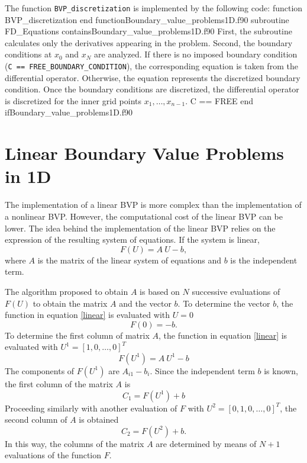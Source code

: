 \newpage 
The function  \verb|BVP_discretization| is implemented by the following code: 
 \vspace{0.2cm} 
             {function BVP_discretization}
             {end function}{Boundary_value_problems1D.f90}
{subroutine FD_Equations}
{contains}{Boundary_value_problems1D.f90}
First, the subroutine calculates only the derivatives appearing in the problem. Second, the boundary conditions at $ x_0 $ and 
$x_N $ are analyzed. If there is no imposed boundary condition (\verb|C == FREE_BOUNDARY_CONDITION|), the corresponding equation is taken 
from  the differential operator. Otherwise, the equation represents the discretized boundary condition. 
Once the boundary conditions are discretized, 
the differential operator is discretized for the inner grid  
points $ x_1, \ldots, x_{n-1}. $
\vspace{0.2cm} 
{C == FREE}
{end if}{Boundary_value_problems1D.f90}

 
 \newpage        
 \section{Linear Boundary Value Problems in 1D}
 The implementation of a linear BVP is more complex than the implementation of a nonlinear BVP. However, the  computational cost of the
 linear BVP can be lower. 
 The idea behind the implementation of the linear BVP relies on the expression of the resulting system of equations. If the system is linear, 
 \begin{equation} 
        F(U) = A \ U - b, 
        \label{linear} 
 \end{equation} 
 where $ A $ is the matrix of the linear system of equations and $ b $ is the independent term. 
 
 
 The algorithm proposed to obtain  $ A $ is based on $ N$ successive evaluations of $ F(U) $ to obtain the matrix $ A $ and the vector $b $.
 To determine the vector $ b $, the function in equation \ref{linear} is evaluated with $ U= 0$  
 $$
   F(0) = - b.
 $$  
 To determine the first column of matrix $ A $, the function in equation \ref{linear} is evaluated with $ U^1 = [1, 0, \ldots, 0]^T $
 $$
    F(U^1) = A \ U^1 - b 
 $$  
 The components of $ F(U^1) $ are $ A_{i1} - b_i$. Since the independent term $ b $ is known, the first column of the matrix $ A $ is 
 $$
  C_1 = F(U^1) + b  
 $$
  Proceeding similarly with another evaluation of $ F $ with $ U^2 = [0, 1, 0, \ldots, 0]^T $, the second column of $ A $ is obtained
  $$
   C_2 = F(U^2) + b.  
  $$ 
 In this way, the columns of the matrix $ A $ are determined by means of  $ N+1$ evaluations of the  function $F $. 
 
